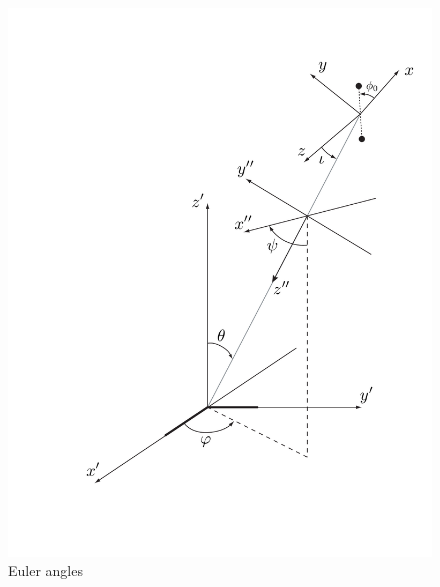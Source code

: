 \begin{figure}[p]
\begin{center}
\includegraphics[width=\linewidth]{figures/inspiral/euler}
\end{center}
\caption{\label{f:euler}%
Euler angles
}
\end{figure}

